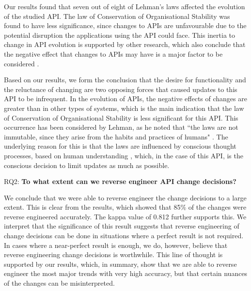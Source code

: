 \documentclass{sig-alternate}
\begin{document}
Our results found that seven out of eight of Lehman's laws affected the evolution of the studied API. The law of Conservation of Organisational Stability was found to have less significance, since changes to APIs are unfavourable due to the potential disruption the applications using the API could face. This inertia to change in API evolution is supported by other research, which also conclude that the negative effect that changes to APIs may have is a major factor to be considered \cite{google_talk, henning2007api, mcdonnell2013empirical, robbes2012developers}. 

Based on our results, we form the conclusion that the desire for functionality and the reluctance of changing are two opposing forces that caused updates to this API to be infrequent. In the evolution of APIs, the negative effects of changes are greater than in other types of systems, which is the main indication that the law of Conservation of Organisational Stability is less significant for this API. This occurrence has been considered by Lehman, as he noted that ``the laws are not immutable, since they arise from the habits and practices of humans" \cite{lehman1980programs}. The underlying reason for this is that the laws are influenced by conscious thought processes, based on human understanding \cite{lehman1980understanding}, which, in the case of this API, is the conscious decision to limit updates as much as possible. 

\smallskip
\noindent
RQ2: \textbf{To what extent can we reverse engineer API change decisions?}
\smallskip

We conclude that we were able to reverse engineer the change decisions to a large extent. This is clear from the results, which showed that 85\% of the changes were reverse engineered accurately. The kappa value of 0.812 further supports this. We interpret that the significance of this result suggests that reverse engineering of change decisions can be done in situations where a perfect result is not required. In cases where a near-perfect result is enough, we do, however, believe that reverse engineering change decisions is worthwhile. This line of thought is supported by our results, which, in summary, show that we are able to reverse engineer the most major trends with very high accuracy, but that certain nuances of the changes can be misinterpreted. 
\end{document}
